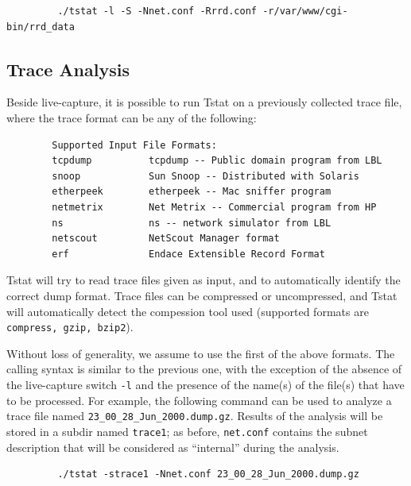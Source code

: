 \documentclass[11pt]{article}
\begin{document}
\begin{small}\begin{verbatim}
         ./tstat -l -S -Nnet.conf -Rrrd.conf -r/var/www/cgi-bin/rrd_data
\end{verbatim}\end{small} \noindent
\subsection{Trace Analysis\label{Trace_Analysis}}


Beside live-capture, it is possible to run Tstat on a previously collected 
trace file, where the trace format can be any of the following:

\begin{small}\begin{verbatim}
        Supported Input File Formats:
        tcpdump          tcpdump -- Public domain program from LBL
        snoop            Sun Snoop -- Distributed with Solaris
        etherpeek        etherpeek -- Mac sniffer program
        netmetrix        Net Metrix -- Commercial program from HP
        ns               ns -- network simulator from LBL
        netscout         NetScout Manager format
        erf              Endace Extensible Record Format
\end{verbatim}\end{small} \noindent
Tstat will try to read trace files given as input, and to automatically identify
the correct dump format. Trace files can be compressed or uncompressed, and
Tstat will automatically detect the compession tool used (supported formats are
\texttt{compress, gzip, bzip2}).



Without loss of generality, we assume to use the first of the above formats. The
calling syntax is similar to the previous one, with the exception of the absence
of the live-capture switch \texttt{-l} and the presence of the name(s) of the file(s)
that have to be processed. For example, the following command can be used to
analyze a trace file named \texttt{23\_00\_28\_Jun\_2000.dump.gz}. Results of the analysis
will be stored in a subdir named \texttt{trace1}; as before, \texttt{net.conf} contains  the
subnet description that  will be  considered as ``internal'' during the
analysis.

\begin{small}\begin{verbatim}
         ./tstat -strace1 -Nnet.conf 23_00_28_Jun_2000.dump.gz
\end{verbatim}\end{small} \noindent
\end{document}

